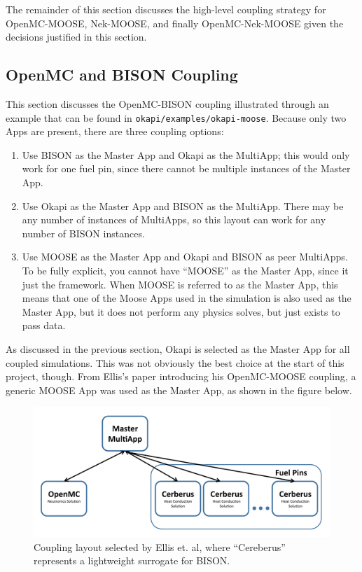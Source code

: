 \documentclass[10pt]{article}
\numberwithin{equation}{section} %
\begin{document}
The remainder of this section discusses the high-level coupling strategy for OpenMC-MOOSE, Nek-MOOSE, and finally OpenMC-Nek-MOOSE given the decisions justified in this section.

\subsection{OpenMC and BISON Coupling}
This section discusses the OpenMC-BISON coupling illustrated through an example that can be found in {\tt okapi/examples/okapi-moose}. Because only two Apps are present, there are three coupling options:

\begin{enumerate}
\item Use BISON as the Master App and Okapi as the MultiApp; this would only work for one fuel pin, since there cannot be multiple instances of the Master App.
\item Use Okapi as the Master App and BISON as the MultiApp. There may be any number of instances of MultiApps, so this layout can work for any number of BISON instances.
\item Use MOOSE as the Master App and Okapi and BISON as peer MultiApps. To be fully explicit, you cannot have ``MOOSE'' as the Master App, since it just the framework. When MOOSE is referred to as the Master App, this means that one of the Moose Apps used in the simulation is also used as the Master App, but it does not perform any physics solves, but just exists to pass data. 
\end{enumerate}

As discussed in the previous section, Okapi is selected as the Master App for all coupled simulations. This was not obviously the best choice at the start of this project, though. From Ellis's paper introducing his OpenMC-MOOSE coupling, a generic MOOSE App was used as the Master App, as shown in the figure below.

\begin{figure}[H]
\centering
\includegraphics[width=13cm]{figures/Ellis-coupling.png}
\caption{Coupling layout selected by Ellis et. al, where ``Cereberus'' represents a lightweight surrogate for BISON.}
\end{figure}
\end{document}
